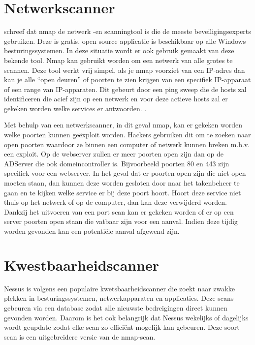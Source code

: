\documentclass[pdftex,a4paper,12pt]{report}
\begin{document}
\section{Netwerkscanner}
\cite{Jackson2010} schreef dat nmap de netwerk -en scanningtool is die de meeste beveiligingsexperts gebruiken. Deze is gratis, open source applicatie is beschikbaar op alle Windows besturingssystemen. In deze situatie wordt er ook gebruik gemaakt van deze bekende tool. Nmap kan gebruikt worden om een netwerk van alle grotes te scannen. Deze tool werkt vrij simpel, als je nmap voorziet van een IP-adres dan kan je alle "`open deuren"' of poorten te zien krijgen van een specifiek IP-apparaat of een range van IP-apparaten. Dit gebeurt door een ping sweep die de hosts zal identificeren die acief zijn op een netwerk en voor deze actieve hosts zal er gekeken worden welke services er antwoorden. \citep{Messer2007}. \newline

Met behulp van een netwerkscanner, in dit geval nmap, kan er gekeken worden welke poorten kunnen geëxploit worden. Hackers gebruiken dit om te zoeken naar open poorten waardoor ze binnen een computer of netwerk kunnen breken m.b.v. een exploit. Op de webserver zullen er meer poorten open zijn dan op de ADServer die ook domeincontroller is. Bijvoorbeeld poorten 80 en 443 zijn specifiek voor een webserver. In het geval dat er poorten open zijn die niet open moeten staan, dan kunnen deze worden gesloten door naar het takenbeheer te gaan en te kijken welke service er bij deze poort hoort. Hoort deze service niet thuis op het netwerk of op de computer, dan kan deze verwijderd worden. Dankzij het uitvoeren van een port scan kan er gekeken worden of er op een server poorten open staan die vatbaar zijn voor een aanval. Indien deze tijdig worden gevonden kan een potentiële aanval afgewend zijn.

\section{Kwestbaarheidscanner}
Nessus is volgens \cite{Jackson2010} een populaire kwetsbaarheidscanner die zoekt naar zwakke plekken in besturingssystemen, netwerkapparaten en applicaties. Deze scans gebeuren via een database zodat alle nieuwste bedreigingen direct kunnen gevonden worden. Daarom is het ook belangrijk dat Nessus wekelijks of dagelijks wordt geupdate zodat elke scan zo efficiënt mogelijk kan gebeuren. Deze soort scan is een uitgebreidere versie van de nmap-scan. \newline
\end{document}
